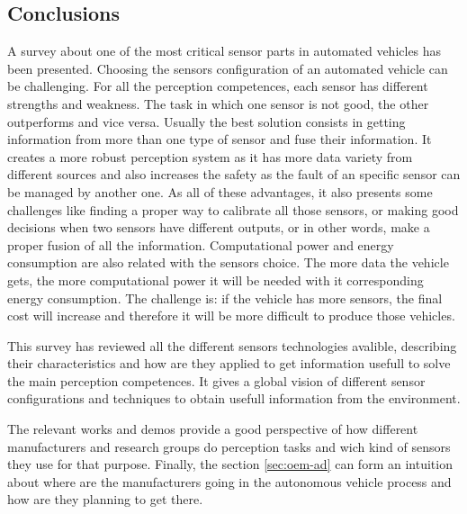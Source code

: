 \subsection{Conclusions}

A survey about one of the most critical sensor parts in automated vehicles has been presented. Choosing the sensors configuration of an automated vehicle can be challenging. For all the perception competences, each sensor has different strengths and weakness. The task in which one sensor is not good, the other outperforms and vice versa. Usually the best solution consists in getting information from more than one type of sensor and fuse their information. It creates a more robust  perception system as it has more data variety from different sources and also increases the safety as the fault of an specific sensor can be managed by another one. As all of these advantages, it also presents some challenges like finding a proper way to calibrate all those sensors, or making good decisions when two sensors have different outputs, or in other words, make a proper fusion of all the information. Computational power and energy consumption are also related with the sensors choice. The more data the vehicle gets, the more computational power it will be needed with it corresponding energy consumption. The challenge is: if the vehicle has more sensors, the final cost will increase and therefore it will be more difficult  to produce those vehicles.

This survey has reviewed all the different sensors technologies avalible, describing their characteristics and how are they applied to get information usefull to solve the main perception competences. It gives a global vision of different sensor configurations and techniques to obtain usefull information from the environment.

The relevant works and demos provide a good perspective of how different manufacturers and research groups do perception tasks and wich kind of sensors they use for that purpose. 
Finally, the section \ref{sec:oem-ad} can form an intuition about where are the 
manufacturers going in the autonomous vehicle process and how are they planning 
to get there.


